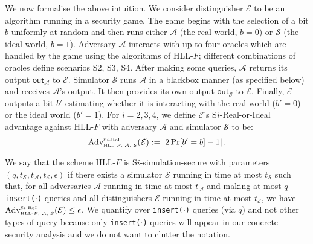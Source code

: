 \documentclass[sigconf, anonymous, dvipsnames]{acmart} %
\begin{document}
We now formalise the above intuition. We consider distinguisher ${\mathcal{E}}$ to be an algorithm running in a security game. The game begins with the selection of a bit $b$ uniformly at random and then runs either ${\mathcal{A}}$ (the real world, $b=0$) or ${\mathcal{S}}$ (the ideal world, $b=1$). Adversary ${\mathcal{A}}$ interacts with up to four oracles which are handled by the game using the algorithms of HLL-$F$; different combinations of oracles define scenarios S2, S3, S4. After making some queries, ${\mathcal{A}}$ returns its output $\textsf{out}_{\mathcal{A}}$ to ${\mathcal{E}}$. Simulator ${\mathcal{S}}$ runs ${\mathcal{A}}$ in a blackbox manner (as specified below) and receives ${\mathcal{A}}$'s output. It then provides its own output $\textsf{out}_{\mathcal{S}}$ to ${\mathcal{E}}$. Finally, ${\mathcal{E}}$ outputs a bit $b'$ estimating whether it is interacting with the real world ($b'=0$) or the ideal world ($b'=1$). For $i=2, 3, 4$, we define ${\mathcal{E}}$'s S$i$-Real-or-Ideal advantage against HLL-$F$ with adversary ${\mathcal{A}}$ and simulator ${\mathcal{S}}$ to be:
\[
\mbox{Adv}^{\mbox{\tiny S$i$-RoI}}_{\mbox{\tiny{HLL-$F$, ${\mathcal{A}}$, ${\mathcal{S}}$}}}({\mathcal{E}}) := \lvert 2\Pr[b' = b] - 1 \rvert \, .
\]

We say that the scheme HLL-$F$ is S$i$-simulation-secure with parameters $(q,t_{\mathcal{S}},t_{\mathcal{A}},t_{\mathcal{E}},\epsilon)$ if there exists a simulator $\mathcal{S}$ running in time at most $t_{\mathcal{S}}$ such that, for all adversaries ${\mathcal{A}}$ running in time at most $t_{\mathcal{A}}$ and making at most $q$ \texttt{insert($\cdot$)} queries and all distinguishers ${\mathcal{E}}$ running in time at most $t_{\mathcal{E}}$, we have
$\mbox{Adv}^{\mbox{\tiny S$i$-RoI}}_{\mbox{\tiny{HLL-$F$, ${\mathcal{A}}$, ${\mathcal{S}}$}}}({\mathcal{E}}) \leq \epsilon$. We quantify over \texttt{insert($\cdot$)} queries (via $q$) and not other types of query because only \texttt{insert($\cdot$)} queries will appear in our concrete security analysis and we do not want to clutter the notation.
\end{document}
